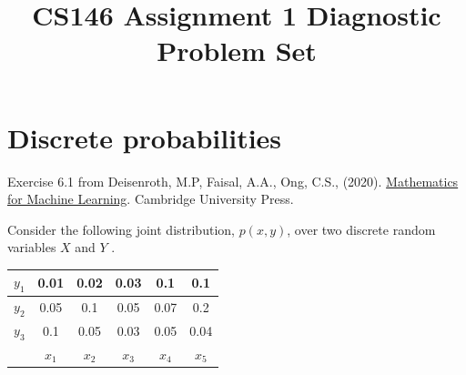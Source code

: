 \documentclass{article}
\begin{document}
\title{CS146 Assignment 1 Diagnostic Problem Set}

\section{Discrete probabilities}

Exercise 6.1 from Deisenroth, M.P, Faisal, A.A., Ong, C.S., (2020). \href{https://mml-book.github.io/book/mml-book.pdf}{Mathematics for Machine Learning}. Cambridge University Press.

Consider the following joint distribution, $p(x, y)$, over two discrete random variables $X$ and $Y$ .
    
\begin{center}
    \begin{tabular}{ |c|c|c|c|c|c| } 
        \hline
        $y_{1}$ & 0.01 & 0.02 & 0.03 & 0.1 & 0.1 \\ 
        \hline
        $y_{2}$ & 0.05 & 0.1 & 0.05 & 0.07 & 0.2 \\
        \hline 
        $y_{3}$ & 0.1 & 0.05 & 0.03 & 0.05 & 0.04 \\ 
        \hline
         & $x_{1}$ & $x_{2}$ & $x_{3}$ & $x_{4}$ & $x_{5}$ \\ 
        \hline
    \end{tabular}
\end{center}
\end{document}
